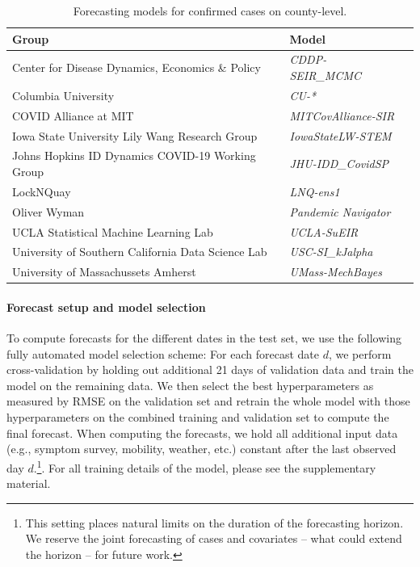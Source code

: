\documentclass{article}
\begin{document}
\begin{table}[t]
\small
\caption{Forecasting models for confirmed cases on county-level.\label{tab:forecasts}}
\centering
\begin{tabular}{lll}
\toprule
\bf Group & \bf Model \\
\midrule
Center for Disease Dynamics, Economics \& Policy & \it CDDP-SEIR\_MCMC & \citep{cddep_seir_mcmc} \\
Columbia University & \it CU-* & \citep{forecasts/columbia} \\
COVID Alliance at MIT & \it MITCovAlliance-SIR & \citep{baek2020limits} \\
Iowa State University Lily Wang Research Group & \it IowaStateLW-STEM & \citep{wang2020spatiotemporal} \\
Johns Hopkins ID Dynamics COVID-19 Working Group & \it JHU-IDD\_CovidSP & \citep{forecasts/jhu_idd_covidsp} \\
LockNQuay & \it LNQ-ens1 & \citep{forecasts/lnq_ens1} \\
Oliver Wyman & \it Pandemic Navigator & \citep{forecasts/oliver_wyman} \\
UCLA Statistical Machine Learning Lab & \it UCLA-SuEIR & \citep{forecasts/Zou2020.05.24.20111989} \\
University of Southern California Data Science Lab & \it USC-SI\_kJalpha & \citep{srivastava2020fast} \\
University of Massachussets Amherst & \it UMass-MechBayes & \citep{forecasts/umass_mechbayes} \\
\bottomrule
\end{tabular}
\end{table}

\paragraph{Forecast setup and model selection} To compute forecasts for the
different dates in the test set, we use the following fully automated model
selection scheme: For each forecast date \(d\), we perform cross-validation by
holding out additional 21 days of validation data and train the model on the
remaining data. We then select the best hyperparameters as measured by RMSE on
the validation set and retrain the whole model with those hyperparameters on the
combined training and validation set to compute the final forecast. When
computing the forecasts, we hold all additional input data (e.g., symptom
survey, mobility, weather, etc.) constant after the last observed day
\(d\).\footnote{This setting places natural limits on the duration of the forecasting
horizon. We reserve the joint forecasting of cases and covariates -- what could
extend the horizon -- for future work.}. For all training details of the model,
please see the supplementary material.
\end{document}
